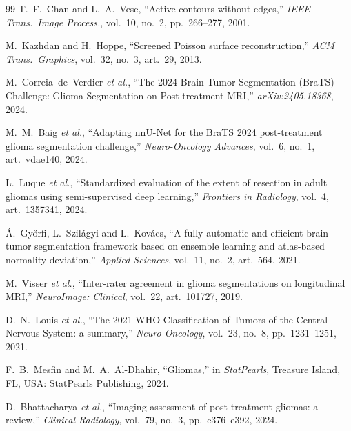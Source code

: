 \documentclass[conference]{IEEEtran}
\begin{document}
\begin{thebibliography}{99}
T.~F.~Chan and L.~A.~Vese,
``Active contours without edges,''
\emph{IEEE Trans.\ Image Process.}, vol.~10, no.~2,
pp.~266--277, 2001.

M.~Kazhdan and H.~Hoppe,
``Screened Poisson surface reconstruction,''
\emph{ACM Trans.\ Graphics}, vol.~32, no.~3, art.~29, 2013.

M.~Correia~de~Verdier \emph{et al.},
``The 2024 Brain Tumor Segmentation (BraTS) Challenge: Glioma
Segmentation on Post-treatment MRI,''
\emph{arXiv:2405.18368}, 2024.

M.~M.~Baig \emph{et al.},
``Adapting nnU-Net for the BraTS 2024 post-treatment glioma
segmentation challenge,''
\emph{Neuro-Oncology Advances}, vol.~6, no.~1, art.~vdae140,
2024.

L.~Luque \emph{et al.},
``Standardized evaluation of the extent of resection in adult
gliomas using semi-supervised deep learning,''
\emph{Frontiers in Radiology}, vol.~4, art.~1357341, 2024.

Á.~Győrfi, L.~Szilágyi and L.~Kovács,
``A fully automatic and efficient brain tumor segmentation
framework based on ensemble learning and atlas-based normality
deviation,''
\emph{Applied Sciences}, vol.~11, no.~2, art.~564, 2021.

M.~Visser \emph{et al.},
``Inter-rater agreement in glioma segmentations on longitudinal
MRI,''
\emph{NeuroImage: Clinical}, vol.~22, art.~101727, 2019.

D.~N.~Louis \emph{et al.},
``The 2021 WHO Classification of Tumors of the Central Nervous
System: a summary,''
\emph{Neuro-Oncology}, vol.~23, no.~8, pp.~1231--1251, 2021.

F.~B.~Mesfin and M.~A.~Al-Dhahir, ``Gliomas,'' in
\emph{StatPearls}, Treasure Island, FL, USA: StatPearls
Publishing, 2024.

D.~Bhattacharya \emph{et al.},
``Imaging assessment of post-treatment gliomas: a review,''
\emph{Clinical Radiology}, vol.~79, no.~3, pp.~e376--e392, 2024.

\end{thebibliography}
\end{document}
